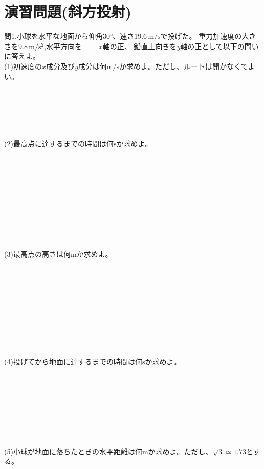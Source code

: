 \documentclass[11pt,twoside]{article}
\begin{document}
	\section{演習問題(斜方投射)}
	問1.小球を水平な地面から仰角$30°$、速さ$19.6\,\si{\metre\per\second}$で投げた。
	重力加速度の大きさを$9.8\,\si{\metre\per\second\squared}$,水平方向を　　\,\,$x$軸の正、
	鉛直上向きを$y$軸の正として以下の問いに答えよ。\\
	(1)初速度の$x$成分及び$y$成分は何$\si{\metre\per\second}$か求めよ。ただし、ルートは開かなくてよい。\\\\\\\\\\\\
	\begin{minipage}[t]{0.44\linewidth}
	(2)最高点に達するまでの時間は何$\si{\second}$か求めよ。\\\\\\\\\\\\\\\\\\\\\\
	(3)最高点の高さは何$\si{\metre}$か求めよ。\\\\\\\\\\\\\\\\\\
	\end{minipage}
	\hfill
	\begin{minipage}[t]{0.44\linewidth}
		\vspace{0.5cm}
	\end{minipage}\\
	(4)投げてから地面に達するまでの時間は何$\si{\second}$か求めよ。\\\\\\\\\\\\\\\\\\
	(5)小球が地面に落ちたときの水平距離は何$\si{\metre}$か求めよ。ただし、$\sqrt{3} \simeq 1.73$とする。



	\clearpage
\end{document}
